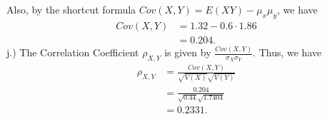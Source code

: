 \documentclass{report}
\begin{document}
Also, by the shortcut formula $Cov(X,Y) = E(XY) - \mu_{x}\mu_{y}$, we have
\begin{align*}
    Cov(X,Y) &= 1.32 - 0.6 \cdot 1.86 \\
    &=0.204
.\end{align*}
\bigbreak \noindent 
j.) The Correlation Coefficient $\rho_{X,Y}$ is given by $\frac{Cov(X,Y)}{\sigma_{X}\sigma_{Y}} $. Thus, we have
\begin{align*}
    \rho_{X,Y} &= \frac{Cov(X,Y)}{\sqrt{V(X)}\sqrt{V(Y)}} \\
    &=\frac{0.204}{\sqrt{0.44}\sqrt{1.7404}} \\
    &=0.2331
.\end{align*}



 
\end{document}
